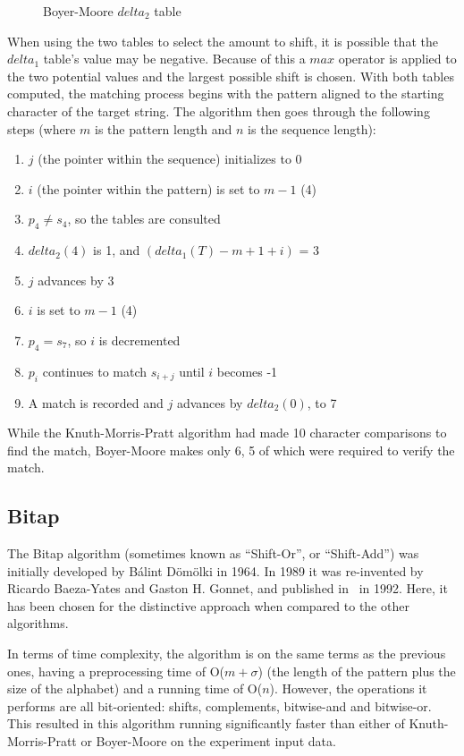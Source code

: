 \begin{figure}[ht]
\centering

\caption{Boyer-Moore $delta_2$ table}
\label{fig:bm_good_suffix}
\end{figure}

When using the two tables to select the amount to shift, it is possible that the $delta_1$ table's value may be negative. Because of this a $max$ operator is applied to the two potential values and the largest possible shift is chosen. With both tables computed, the matching process begins with the pattern aligned to the starting character of the target string. The algorithm then goes through the following steps (where $m$ is the pattern length and $n$ is the sequence length):

\begin{enumerate}
\item $j$ (the pointer within the sequence) initializes to 0
\item $i$ (the pointer within the pattern) is set to $m - 1$ (4)
\item $p_4 \neq s_4$, so the tables are consulted
\item $delta_2(4)$ is 1, and $(delta_1(T) - m + 1 + i)$ = 3
\item $j$ advances by 3
\item $i$ is set to $m - 1$ (4)
\item $p_4 = s_7$, so $i$ is decremented
\item $p_i$ continues to match $s_{i+j}$ until $i$ becomes -1
\item A match is recorded and $j$ advances by $delta_2(0)$, to 7
\end{enumerate}

While the Knuth-Morris-Pratt algorithm had made 10 character comparisons to find the match, Boyer-Moore makes only 6, 5 of which were required to verify the match.

\subsection{Bitap}

The Bitap algorithm (sometimes known as ``Shift-Or'', or ``Shift-Add'') was initially developed by B\'{a}lint D\"{o}m\"{o}lki in 1964. In 1989 it was re-invented by Ricardo Baeza-Yates and Gaston H. Gonnet, and published in~\cite{baeza} in 1992. Here, it has been chosen for the distinctive approach when compared to the other algorithms.

In terms of time complexity, the algorithm is on the same terms as the previous ones, having a preprocessing time of O($m+\sigma$) (the length of the pattern plus the size of the alphabet) and a running time of O($n$). However, the operations it performs are all bit-oriented: shifts, complements, bitwise-and and bitwise-or. This resulted in this algorithm running significantly faster than either of Knuth-Morris-Pratt or Boyer-Moore on the experiment input data.

